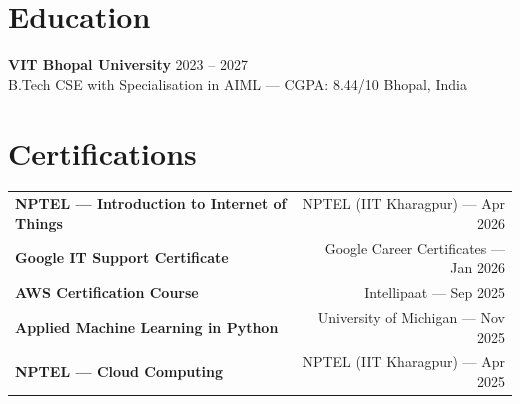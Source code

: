 \documentclass[letterpaper,10pt]{article}
\begin{document}
\section{Education}
\textbf{VIT Bhopal University} \hfill 2023 -- 2027 \\
B.Tech CSE with Specialisation in AIML --- CGPA: 8.44/10 \hfill Bhopal, India

\section{Certifications}
\begin{tabularx}{\textwidth}{@{}X r@{}}
\textbf{NPTEL --- Introduction to Internet of Things} & NPTEL (IIT Kharagpur) --- Apr 2026 \\
\textbf{Google IT Support Certificate} & Google Career Certificates --- Jan 2026 \\
\textbf{AWS Certification Course} & Intellipaat --- Sep 2025 \\
\textbf{Applied Machine Learning in Python} & University of Michigan --- Nov 2025 \\
\textbf{NPTEL --- Cloud Computing} & NPTEL (IIT Kharagpur) --- Apr 2025 \\
\end{tabularx}
\end{document}
